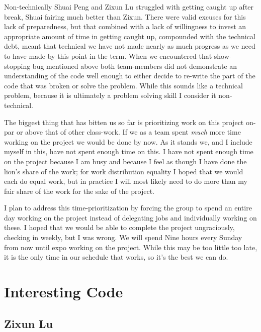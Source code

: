 Non-technically Shuai Peng and Zixun Lu struggled with getting caught up after break, Shuai fairing much better than Zixun.
There were valid excuses for this lack of preparedness, but that combined with a lack of willingness to invest an appropriate amount of time in getting caught up, compounded with the technical debt, meant that technical we have not made nearly as much progress as we need to have made by this point in the term.
When we encountered that show-stopping bug mentioned above both team-members did not demonstrate an understanding of the code well enough to either decide to re-write the part of the code that was broken or solve the problem.
While this sounds like a technical problem, because it is ultimately a problem solving skill I consider it non-technical.

The biggest thing that has bitten us so far is prioritizing work on this project on-par or above that of other class-work.
If we as a team spent \textit{much} more time working on the project we would be done by now.
As it stands we, and I include myself in this, have not spent enough time on this.
I have not spent enough time on the project because I am busy and because I feel as though I have done the lion's share of the work; for work distribution equality I hoped that we would each do equal work, but in practice I will most likely need to do more than my fair share of the work for the sake of the project.

I plan to address this time-prioritization by forcing the group to spend an entire day working on the project instead of delegating jobs and individually working on these.
I hoped that we would be able to complete the project ungraciously, checking in weekly, but I was wrong.
We will spend Nine hours every Sunday from now until expo working on the project.
While this may be too little too late, it is the only time in our schedule that works, so it's the best we can do.

\section{Interesting Code}

\subsection{Zixun Lu}

